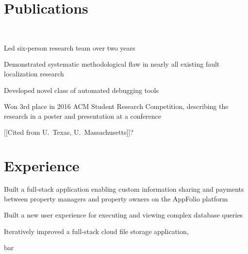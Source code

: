\documentclass[]{resume}
\begin{document}
\begin{minipage}[t]{0.66\textwidth}



\section{Publications}

 \\
\vspace{\topsep} %
\begin{tightemize}
\item Led six-person research team over two years
\item Demonstrated systematic methodological flaw in nearly all existing fault localization research
\item Developed novel class of automated debugging tools
\item Won 3rd place in 2016 ACM Student Research Competition, describing the research in a poster and presentation at a conference
\item {[[}Cited from U.~Texas, U.~Massachusetts{]]}?
\end{tightemize}
\sectionsep



\section{Experience}

\begin{tightemize}
\item Built a full-stack application enabling custom information sharing and payments between property managers and property owners on the AppFolio platform
\item Built a new user experience for executing and viewing complex database queries
\end{tightemize}
\sectionsep

\begin{tightemize}
\item Iteratively improved a full-stack cloud file storage application,
\item bar
\end{tightemize}
\sectionsep




\end{minipage}
\end{document}
